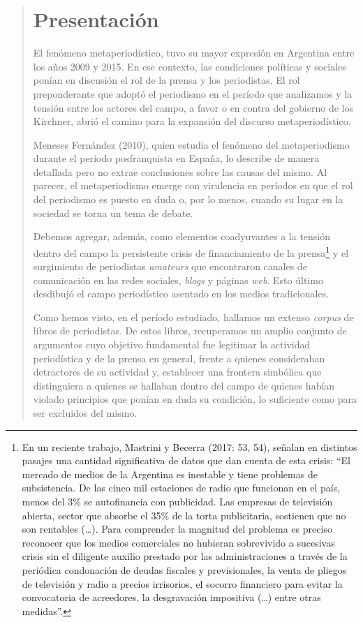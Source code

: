 \begin{quote}
\section {Presentación}

El fenómeno metaperiodístico,  tuvo su mayor expresión en Argentina entre los años 2009 y 2015. En ese contexto, las condiciones políticas y sociales ponían en discusión el rol de la prensa y los periodistas. El rol preponderante que adoptó el periodismo en el período que analizamos y la tensión entre los actores del campo, a favor o en contra del gobierno de los Kirchner, abrió el camino para la expansión del discurso metaperiodístico.

Meneses Fernández (2010), quien estudia el fenómeno del metaperiodismo durante el período posfranquista en España, lo describe de manera detallada pero no extrae conclusiones sobre las causas del mismo. Al parecer, el metaperiodismo emerge con virulencia en períodos en que el rol del periodismo es puesto en duda o, por lo menos, cuando su lugar en la sociedad se torna un tema de debate.

Debemos agregar, además, como elementos coadyuvantes a la tensión dentro del campo la persistente crisis de financiamiento de la prensa\footnote{En un reciente trabajo, Mastrini y Becerra (2017: 53, 54), señalan en distintos pasajes una cantidad significativa de datos que dan cuenta de esta crisis: \enquote{El mercado de medios de la Argentina es inestable y tiene problemas de subsistencia. De las cinco mil estaciones de radio que funcionan en el país, menos del 3\% se autofinancia con publicidad. Las empresas de televisión abierta, sector que absorbe el 35\% de la torta publicitaria, sostienen que no son rentables (…). Para comprender la magnitud del problema es preciso reconocer que los medios comerciales no hubieran sobrevivido a sucesivas crisis sin el diligente auxilio prestado por las administraciones a través de la periódica condonación de deudas fiscales y previsionales, la venta de pliegos de televisión y radio a precios irrisorios, el socorro financiero para evitar la convocatoria de acreedores, la desgravación impositiva (…) entre otras medidas}.} y el surgimiento de periodistas \emph{amateurs} que encontraron canales de comunicación en las redes sociales, \emph{blogs} y páginas \emph{web}. Esto último desdibujó el campo periodístico asentado en los medios tradicionales.

Como hemos visto, en el período estudiado, hallamos un extenso \emph{corpus} de libros de periodistas. De estos libros, recuperamos un amplio conjunto de argumentos cuyo objetivo fundamental fue legitimar la actividad periodística y de la prensa en general, frente a quienes consideraban detractores de su actividad y, establecer una frontera simbólica que distinguiera a quienes se hallaban dentro del campo de quienes habían violado principios que ponían en duda su condición, lo suficiente como para ser excluidos del mismo.


\end{quote}
